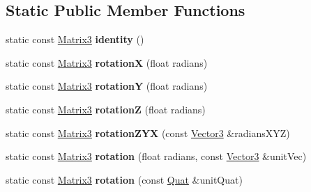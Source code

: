 \subsection*{Static Public Member Functions}
\begin{DoxyCompactItemize}
\item 
\mbox{\label{classVectormath_1_1Aos_1_1Matrix3_a2a547d4b9b834f6a7fbe9e8ed91e5104}} 
static const \hyperlink{classVectormath_1_1Aos_1_1Matrix3}{Matrix3} {\bfseries identity} ()
\item 
\mbox{\label{classVectormath_1_1Aos_1_1Matrix3_a77a1df8b08c098f7791c42d5f38b7824}} 
static const \hyperlink{classVectormath_1_1Aos_1_1Matrix3}{Matrix3} {\bfseries rotationX} (float radians)
\item 
\mbox{\label{classVectormath_1_1Aos_1_1Matrix3_aa5c4755f2831ef1e91990b67f7e5d1c4}} 
static const \hyperlink{classVectormath_1_1Aos_1_1Matrix3}{Matrix3} {\bfseries rotationY} (float radians)
\item 
\mbox{\label{classVectormath_1_1Aos_1_1Matrix3_aa512238d83080ba01a5e495fb70ddccb}} 
static const \hyperlink{classVectormath_1_1Aos_1_1Matrix3}{Matrix3} {\bfseries rotationZ} (float radians)
\item 
\mbox{\label{classVectormath_1_1Aos_1_1Matrix3_a06f5e5c5c28985521d6ac23a5cbcce85}} 
static const \hyperlink{classVectormath_1_1Aos_1_1Matrix3}{Matrix3} {\bfseries rotation\+Z\+YX} (const \hyperlink{classVectormath_1_1Aos_1_1Vector3}{Vector3} \&radians\+X\+YZ)
\item 
\mbox{\label{classVectormath_1_1Aos_1_1Matrix3_aa94ef7bd316734d28409207b2acc28d3}} 
static const \hyperlink{classVectormath_1_1Aos_1_1Matrix3}{Matrix3} {\bfseries rotation} (float radians, const \hyperlink{classVectormath_1_1Aos_1_1Vector3}{Vector3} \&unit\+Vec)
\item 
\mbox{\label{classVectormath_1_1Aos_1_1Matrix3_a3327257a702b9cb2d7812ddce7031368}} 
static const \hyperlink{classVectormath_1_1Aos_1_1Matrix3}{Matrix3} {\bfseries rotation} (const \hyperlink{classVectormath_1_1Aos_1_1Quat}{Quat} \&unit\+Quat)

\end{DoxyCompactItemize}
